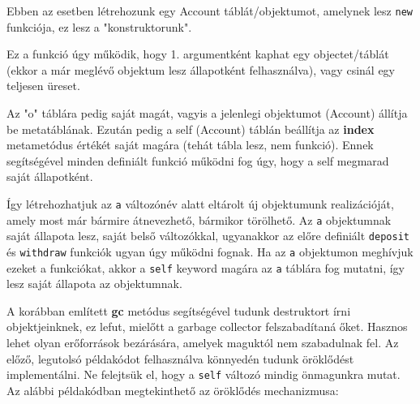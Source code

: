 Ebben az esetben létrehozunk egy Account táblát/objektumot, amelynek lesz \texttt{new} funkciója, ez lesz a "konstruktorunk".

Ez a funkció úgy működik, hogy 1. argumentként kaphat egy objectet/táblát (ekkor a már meglévő objektum lesz állapotként felhasználva), vagy csinál egy teljesen üreset.

Az "o" táblára pedig saját magát, vagyis a jelenlegi objektumot (Account) állítja be metatáblának. Ezután pedig a self (Account) táblán beállítja az \detokenize{__}\textbf{index} metametódus értékét saját magára (tehát tábla lesz, nem funkció). Ennek segítségével minden definiált funkció működni fog úgy, hogy a self megmarad saját állapotként.

Így létrehozhatjuk az \texttt{a} változónév alatt eltárolt új objektumunk realizációját, amely most már bármire átnevezhető, bármikor törölhető. Az \texttt{a} objektumnak saját állapota lesz, saját belső változókkal, ugyanakkor az előre definiált \texttt{deposit} és \texttt{withdraw} funkciók ugyan úgy működni fognak. Ha az \texttt{a} objektumon meghívjuk ezeket a funkciókat, akkor a \texttt{self} keyword magára az \texttt{a} táblára fog mutatni, így lesz saját állapota az objektumnak.

A korábban említett \detokenize{__}\textbf{gc} metódus segítségével tudunk destruktort írni objektjeinknek, ez lefut, mielőtt a garbage collector felszabadítaná őket. Hasznos lehet olyan erőforrások bezárására, amelyek maguktól nem szabadulnak fel.
\pagebreak
{}
Az előző, legutolsó példakódot felhasználva könnyedén tudunk öröklődést implementálni. Ne felejtsük el, hogy a \texttt{self} változó mindig önmagunkra mutat. Az alábbi példakódban megtekinthető az öröklődés mechanizmusa:

